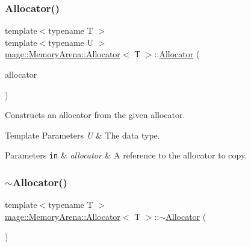 \subsubsection{\texorpdfstring{Allocator()}{Allocator()}\hspace{0.1cm}{\footnotesize\ttfamily [3/4]}}
{\footnotesize\ttfamily template$<$typename T $>$ \\
template$<$typename U $>$ \\
\mbox{\hyperlink{classmage_1_1_memory_arena_1_1_allocator}{mage\+::\+Memory\+Arena\+::\+Allocator}}$<$ T $>$\+::\mbox{\hyperlink{classmage_1_1_memory_arena_1_1_allocator}{Allocator}} (\begin{DoxyParamCaption}\item[{const \mbox{\hyperlink{classmage_1_1_memory_arena_1_1_allocator}{Allocator}}$<$ U $>$ \&}]{allocator }\end{DoxyParamCaption})\hspace{0.3cm}{\ttfamily [noexcept]}}

Constructs an allocator from the given allocator.


\begin{DoxyTemplParams}{Template Parameters}
{\em U} & The data type. \\
\hline
\end{DoxyTemplParams}

\begin{DoxyParams}[1]{Parameters}
\mbox{\tt in}  & {\em allocator} & A reference to the allocator to copy. \\
\hline
\end{DoxyParams}
\mbox{\label{classmage_1_1_memory_arena_1_1_allocator_afbac57b961cea93932dff48c0a104c50}} 
\subsubsection{\texorpdfstring{$\sim$\+Allocator()}{~Allocator()}}
{\footnotesize\ttfamily template$<$typename T $>$ \\
\mbox{\hyperlink{classmage_1_1_memory_arena_1_1_allocator}{mage\+::\+Memory\+Arena\+::\+Allocator}}$<$ T $>$\+::$\sim$\mbox{\hyperlink{classmage_1_1_memory_arena_1_1_allocator}{Allocator}} (\begin{DoxyParamCaption}{ }\end{DoxyParamCaption})\hspace{0.3cm}{\ttfamily [default]}}

